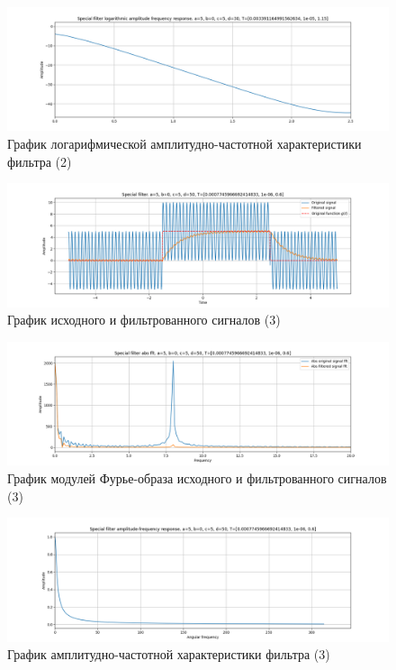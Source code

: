 \documentclass[a4paper, 12pt]{article}
\begin{document}
    \begin{figure}[H]
        \centering
        \includegraphics[scale=0.4]{2_fl2_lafr.png}
        \captionsetup{skip=0pt}
        \caption{График логарифмической амплитудно-частотной характеристики фильтра (2)}
        \label{fig:filinlafr22}
    \end{figure}
    \begin{figure}[H]
        \centering
        \includegraphics[scale=0.4]{3_fl2.png}
        \captionsetup{skip=0pt}
        \caption{График исходного и фильтрованного сигналов (3)}
        \label{fig:filin23}
    \end{figure}
    \begin{figure}[H]
        \centering
        \includegraphics[scale=0.4]{3_fl2_abs.png}
        \captionsetup{skip=0pt}
        \caption{График модулей Фурье-образа исходного и фильтрованного сигналов (3)}
        \label{fig:filinabs23}
    \end{figure}
    \begin{figure}[H]
        \centering
        \includegraphics[scale=0.4]{3_fl2_afr.png}
        \captionsetup{skip=0pt}
        \caption{График амплитудно-частотной характеристики фильтра (3)}
        \label{fig:filinafr23}
    \end{figure}
\end{document}
